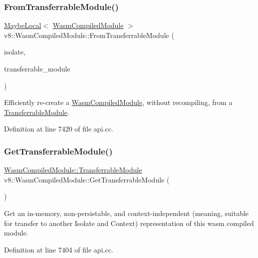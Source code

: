 \subsubsection{\texorpdfstring{From\+Transferrable\+Module()}{FromTransferrableModule()}}
{\footnotesize\ttfamily \mbox{\hyperlink{classv8_1_1MaybeLocal}{Maybe\+Local}}$<$ \mbox{\hyperlink{classv8_1_1WasmCompiledModule}{Wasm\+Compiled\+Module}} $>$ v8\+::\+Wasm\+Compiled\+Module\+::\+From\+Transferrable\+Module (\begin{DoxyParamCaption}\item[{Isolate $\ast$}]{isolate,  }\item[{const \mbox{\hyperlink{classv8_1_1WasmCompiledModule_1_1TransferrableModule}{Transferrable\+Module}} \&}]{transferrable\+\_\+module }\end{DoxyParamCaption})\hspace{0.3cm}{\ttfamily [static]}}

Efficiently re-\/create a \mbox{\hyperlink{classv8_1_1WasmCompiledModule}{Wasm\+Compiled\+Module}}, without recompiling, from a \mbox{\hyperlink{classv8_1_1WasmCompiledModule_1_1TransferrableModule}{Transferrable\+Module}}. 

Definition at line 7420 of file api.\+cc.

\mbox{\label{classv8_1_1WasmCompiledModule_a8960a296a1b431625a0bb0809843308b}} 
\subsubsection{\texorpdfstring{Get\+Transferrable\+Module()}{GetTransferrableModule()}}
{\footnotesize\ttfamily \mbox{\hyperlink{classv8_1_1WasmCompiledModule_1_1TransferrableModule}{Wasm\+Compiled\+Module\+::\+Transferrable\+Module}} v8\+::\+Wasm\+Compiled\+Module\+::\+Get\+Transferrable\+Module (\begin{DoxyParamCaption}{ }\end{DoxyParamCaption})}

Get an in-\/memory, non-\/persistable, and context-\/independent (meaning, suitable for transfer to another Isolate and Context) representation of this wasm compiled module. 

Definition at line 7404 of file api.\+cc.

